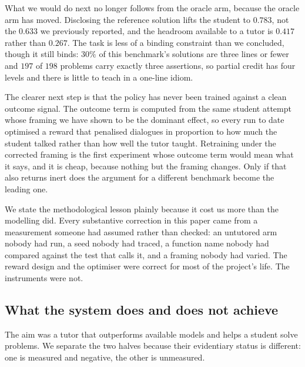 What we would do next no longer follows from the oracle arm, because the oracle
arm has moved. Disclosing the reference solution lifts the student to $0.783$,
not the $0.633$ we previously reported, and the headroom available to a tutor is
$0.417$ rather than $0.267$. The task is less of a binding constraint than we
concluded, though it still binds: $30\%$ of this benchmark's solutions are three
lines or fewer and $197$ of $198$ problems carry exactly three assertions, so
partial credit has four levels and there is little to teach in a one-line idiom.

The clearer next step is that the policy has never been trained against a clean
outcome signal. The outcome term is computed from the same student attempt whose
framing we have shown to be the dominant effect, so every run to date optimised
a reward that penalised dialogues in proportion to how much the student talked
rather than how well the tutor taught. Retraining under the corrected framing is
the first experiment whose outcome term would mean what it says, and it is
cheap, because nothing but the framing changes. Only if that also returns inert
does the argument for a different benchmark become the leading one.

We state the methodological lesson plainly because it cost us more than the
modelling did. Every substantive correction in this paper came from a
measurement someone had assumed rather than checked: an untutored arm nobody had
run, a seed nobody had traced, a function name nobody had compared against the
test that calls it, and a framing nobody had varied. The reward design and the
optimiser were correct for most of the project's life. The instruments were not.


%
\subsection{What the system does and does not achieve}
\label{sec:claims}

The aim was a tutor that outperforms available models and helps a student
solve problems. We separate the two halves because their evidentiary status is
different: one is measured and negative, the other is unmeasured.

